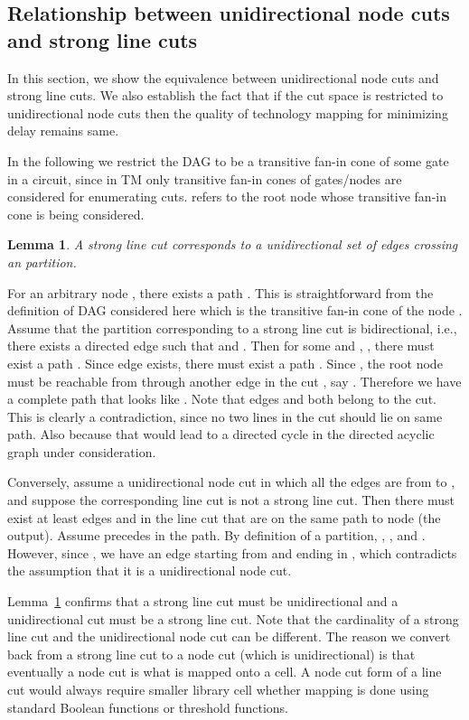 \documentclass[journal]{IEEEtran}
\newtheorem{lemma}{Lemma}
\begin{document}
\subsection{Relationship between unidirectional node cuts and strong line cuts}
In this section, we show the equivalence between unidirectional node cuts and strong line cuts. We also establish the fact that if the cut space is restricted to unidirectional node cuts then the quality of technology mapping for minimizing delay remains same.

In the following we restrict the DAG to be a transitive fan-in cone of some gate in a circuit, since in TM  only transitive fan-in cones of gates/nodes are considered for enumerating cuts.  refers to the root node whose transitive fan-in cone is being considered. 

\begin{lemma}
\label{lem:unidirmis}
A strong line cut corresponds to a unidirectional set of edges crossing an  partition.
\end{lemma}
\begin{IEEEproof}
For an arbitrary node , there exists a path .  This is straightforward from the definition of DAG considered here which is the transitive fan-in cone of the node . 
Assume that the  partition corresponding to a strong line cut  is bidirectional, i.e., there exists a directed edge  such that  and . Then for some  and , ,  there must exist a path . 
Since edge  exists, there must exist a path . Since , the root node  must be reachable from  through another edge in the cut , say . Therefore we have a complete path that looks like . Note that edges  and  both belong to the cut. This is clearly a contradiction, since no two lines in the cut  should lie on same path. Also  because that would lead to a directed cycle  in the directed acyclic graph under consideration.

Conversely, assume a unidirectional node cut in which all the edges are from  to , and suppose the corresponding line cut is not a strong line cut.  Then there must exist at least edges  and  in the line cut that are on the same path to node  (the output).  Assume  precedes  in the path.  By definition of a  partition, , ,  and .  However, since , we have an edge starting from  and ending in , which contradicts the assumption that it is a unidirectional node cut. 
\end{IEEEproof}

Lemma~\ref{lem:unidirmis} confirms that a strong line cut must be unidirectional and a unidirectional cut must be a strong line cut. 
Note that the cardinality of a strong line cut and the unidirectional node cut can be different. The reason we convert back from a strong line cut to a node cut (which is unidirectional) is that eventually a node cut is what is mapped onto a cell. A node cut form of a line cut would always require smaller library cell whether mapping is done using standard Boolean functions or threshold functions.
\end{document}
